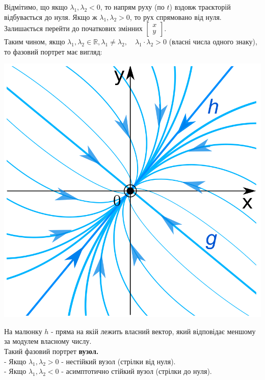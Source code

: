 \documentclass[14pt,a4paper]{scrartcl}
\theoremstyle{definition}
\theoremstyle{definition}
\theoremstyle{definition}
\begin{document}
 Відмітимо, що якщо $\lambda_1, \lambda_2 < 0$, то напрям руху (по $t$) вздовж траєкторій відбувається до нуля. Якщо ж $\lambda_1, \lambda_2 >0$, то рух спрямовано від нуля.\\

 Залишається перейти до початкових змінних $ \begin{bmatrix}
  x \\
   y
 \end{bmatrix}$.\\
Таким чином, якщо $\lambda_1 , \lambda_2 \in \mathbb{R}, \lambda_1 \neq \lambda_2, \quad \lambda_1 \cdot \lambda_2 > 0$ (власні числа одного знаку), то фазовий портрет має вигляд:

\begin{center} \includegraphics[scale=0.37]{assets/lectures_recent-deaf1762.png} \end{center}

На малюнку $h$ - пряма на якій лежить власний вектор, який відповідає меншому за модулем власному числу.\\
Такий фазовий портрет \textbf{вузол.}\\
- Якщо $\lambda_1, \lambda_2 > 0$ - нестійкий вузол (стрілки від нуля).\\
- Якщо $\lambda_1, \lambda_2 < 0$ - асимптотично стійкий вузол (стрілки до нуля). \\
\end{document}
